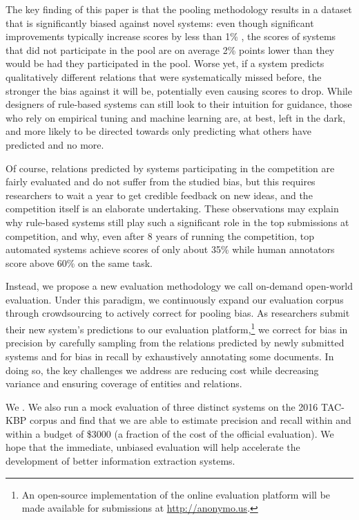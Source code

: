 The key finding of this paper is that the pooling methodology results in a dataset that is significantly biased against novel systems: 
even though significant improvements typically increase scores by less than 1\% \fone{},
the \fone{} scores of systems that did not participate in the pool are on average 2\% points lower than they would be had they participated in the pool.
Worse yet, if a system predicts qualitatively different relations that were systematically missed before, the stronger the bias against it will be, potentially even causing scores to drop.
While designers of rule-based systems can still look to their intuition for guidance, those who rely on empirical tuning and machine learning are, at best, left in the dark, and more likely to be directed towards only predicting what others have predicted and no more.

Of course, relations predicted by systems participating in the competition are fairly evaluated and do not suffer from the studied bias, but this requires researchers to wait a year to get credible feedback on new ideas, and the competition itself is an elaborate undertaking.
%
These observations may explain why rule-based systems still play such a significant role in the top submissions at competition, and why, even after 8 years of running the competition, top automated systems achieve scores of only about 35\% \fone{} while human annotators score above 60\% \fone{} on the same task.

Instead, we propose a new evaluation methodology we call on-demand open-world evaluation.
Under this paradigm, we continuously expand our evaluation corpus through crowdsourcing to actively correct for pooling bias.
As researchers submit their new system's predictions to our evaluation platform,\footnote{%
  An open-source implementation of the online evaluation platform will be made available for submissions at \url{http://anonymo.us}.
}
  we correct for bias in precision by carefully sampling from the relations predicted by newly submitted systems and
  for bias in recall by exhaustively annotating some documents.
In doing so, the key challenges we address are reducing cost while decreasing variance and ensuring coverage of entities and relations.

We .
We also run a mock evaluation of three distinct systems on the 2016 TAC-KBP corpus and find that we are able to estimate precision and recall within  and within a budget of \$3000 (a fraction of the cost of the official evaluation). 
We hope that the immediate, unbiased evaluation
will help accelerate the development of better information extraction systems.


